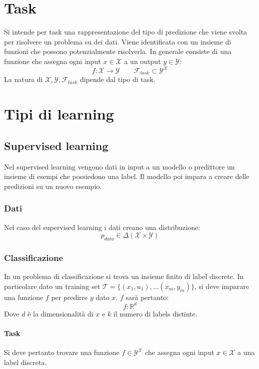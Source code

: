 \section{Task}
Si intende per task una rappresentazione del tipo di predizione che viene svolta per risolvere un problema su dei dati.
Viene identificata con un insieme di funzioni che possono potenzialmente risolverla.
In generale consiste di una funzione che assegna ogni input $x\in\mathcal{X}$ a un output $y\in\mathcal{Y}$:
$$f:\mathcal{X}\rightarrow\mathcal{Y}\qquad\mathcal{F}_{task}\subset\mathcal{Y^X}$$
La natura di $\mathcal{X},\mathcal{Y}, \mathcal{F}_{task}$ dipende dal tipo di task.

\section{Tipi di learning}

	\subsection{Supervised learning}
	Nel supervised learning vengono dati in input a un modello o predittore un insieme di esempi che possiedono una label.
	Il modello poi impara a creare delle predizioni su un nuovo esempio.

		\subsubsection{Dati}
		Nel caso del supervised learning i dati creano una distribuzione:
		$$p_{data}\in\Delta(\mathcal{X}\times\mathcal{Y})$$

		\subsubsection{Classificazione}
		In un problema di classificazione si trova un insieme finito di label discrete.
		In particolare dato un training set $\mathcal{T} = \{(x_1, u_1),\dots(x_m, y_m)\}$, si deve imparare una funzione $f$ per predirre $y$ dato $x$.
		$f$ sar\`a pertanto:
		$$f:\mathbb{R}^d$$%
		Dove $d$ \`e la dimensionalit\`a di $x$ e $k$ il numero di labels distinte.

			\paragraph{Task}
			Si deve pertanto trovare una funzione $f\in\mathcal{Y^X}$ che assegna ogni input $x\in\mathcal{X}$ a una label discreta.

